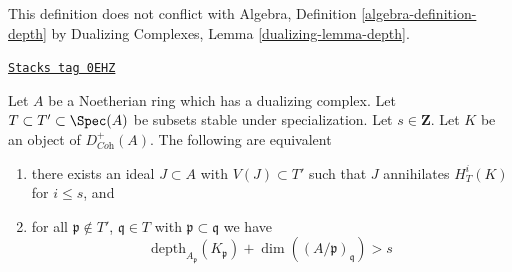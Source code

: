 This definition does not conflict with
Algebra, Definition \ref{algebra-definition-depth}
by Dualizing Complexes, Lemma \ref{dualizing-lemma-depth}.

\begin{proposition}
\label{local-cohomology-proposition-annihilator-complex}
\href{https://stacks.math.columbia.edu/tag/0EHZ}{\texttt{Stacks tag 0EHZ}}

Let $A$ be a Noetherian ring which has a dualizing complex.
Let $T \subset T' \subset \Spec(A)$ be subsets stable under
specialization. Let $s \in \mathbf{Z}$. Let $K$ be an object of
$D_{\textit{Coh}}^+(A)$. The following are equivalent
\begin{enumerate}
\item there exists an ideal $J \subset A$ with $V(J) \subset T'$
such that $J$ annihilates $H^i_T(K)$ for $i \leq s$, and
\item for all $\mathfrak p \not \in T'$,
$\mathfrak q \in T$ with $\mathfrak p \subset \mathfrak q$
we have
$$
\text{depth}_{A_\mathfrak p}(K_\mathfrak p) +
\dim((A/\mathfrak p)_\mathfrak q) > s
$$
\end{enumerate}
\end{proposition}

